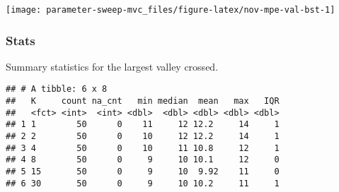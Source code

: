 \documentclass[]{book}
\newenvironment{Shaded}{\begin{snugshade}}{\end{snugshade}}
\newcommand{\DataTypeTok}[1]{\textcolor[rgb]{0.13,0.29,0.53}{#1}}
\newcommand{\KeywordTok}[1]{\textcolor[rgb]{0.13,0.29,0.53}{\textbf{#1}}}
\newcommand{\NormalTok}[1]{#1}
\newcommand{\OperatorTok}[1]{\textcolor[rgb]{0.81,0.36,0.00}{\textbf{#1}}}
\newcommand{\OtherTok}[1]{\textcolor[rgb]{0.56,0.35,0.01}{#1}}
\newcommand{\StringTok}[1]{\textcolor[rgb]{0.31,0.60,0.02}{#1}}
\begin{document}
\texttt{[image: parameter-sweep-mvc\_files/figure-latex/nov-mpe-val-bst-1]}

\hypertarget{stats-59}{%
\subsubsection{Stats}\label{stats-59}}

Summary statistics for the largest valley crossed.

\begin{Shaded}
\end{Shaded}

\begin{verbatim}
## # A tibble: 6 x 8
##   K     count na_cnt   min median  mean   max   IQR
##   <fct> <int>  <int> <dbl>  <dbl> <dbl> <dbl> <dbl>
## 1 1        50      0    11     12 12.2     14     1
## 2 2        50      0    10     12 12.2     14     1
## 3 4        50      0    10     11 10.8     12     1
## 4 8        50      0     9     10 10.1     12     0
## 5 15       50      0     9     10  9.92    11     0
## 6 30       50      0     9     10 10.2     11     1
\end{verbatim}
\end{document}
